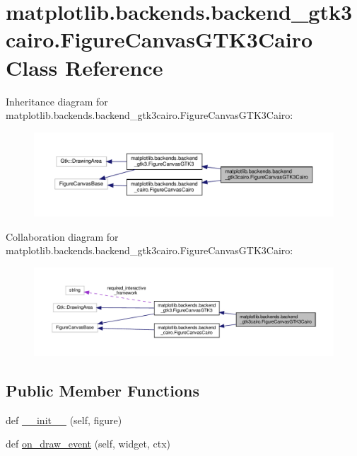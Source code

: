\hypertarget{classmatplotlib_1_1backends_1_1backend__gtk3cairo_1_1FigureCanvasGTK3Cairo}{}\section{matplotlib.\+backends.\+backend\+\_\+gtk3cairo.\+Figure\+Canvas\+G\+T\+K3\+Cairo Class Reference}
\label{classmatplotlib_1_1backends_1_1backend__gtk3cairo_1_1FigureCanvasGTK3Cairo}


Inheritance diagram for matplotlib.\+backends.\+backend\+\_\+gtk3cairo.\+Figure\+Canvas\+G\+T\+K3\+Cairo\+:
\nopagebreak
\begin{figure}[H]
\begin{center}
\leavevmode
\includegraphics[width=350pt]{classmatplotlib_1_1backends_1_1backend__gtk3cairo_1_1FigureCanvasGTK3Cairo__inherit__graph}
\end{center}
\end{figure}


Collaboration diagram for matplotlib.\+backends.\+backend\+\_\+gtk3cairo.\+Figure\+Canvas\+G\+T\+K3\+Cairo\+:
\nopagebreak
\begin{figure}[H]
\begin{center}
\leavevmode
\includegraphics[width=350pt]{classmatplotlib_1_1backends_1_1backend__gtk3cairo_1_1FigureCanvasGTK3Cairo__coll__graph}
\end{center}
\end{figure}
\subsection*{Public Member Functions}
\begin{DoxyCompactItemize}
\item 
def \hyperlink{classmatplotlib_1_1backends_1_1backend__gtk3cairo_1_1FigureCanvasGTK3Cairo_a6958be844d577a0a36560fa0015e1f8f}{\+\_\+\+\_\+init\+\_\+\+\_\+} (self, figure)
\item 
def \hyperlink{classmatplotlib_1_1backends_1_1backend__gtk3cairo_1_1FigureCanvasGTK3Cairo_afbd40ea54d9ae7f357daa3be7efc149e}{on\+\_\+draw\+\_\+event} (self, widget, ctx)
\end{DoxyCompactItemize}
